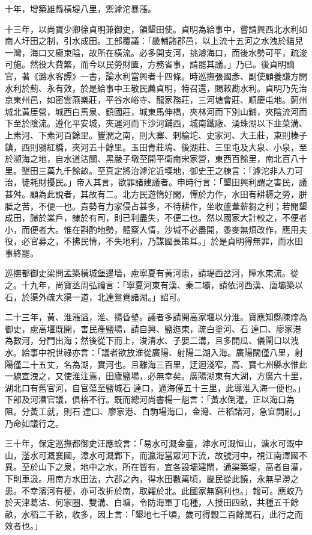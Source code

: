 十年，增築雄縣橫堤八里，禦滹沱暴漲。

十三年，以尚寶少卿徐貞明兼御史，領墾田使。貞明為給事中，嘗請興西北水利如南人圩田之制，引水成田。工部覆議：「畿輔諸郡邑，以上流十五河之水洩於貓兒一灣，海口又極束隘，故所在橫流。必多開支河，挑濬海口，而後水勢可平，疏浚可施。然役大費繁，而今以民勞財匱，方務省事，請罷其議。」乃已。後貞明謫官，著《潞水客譚》一書，論水利當興者十四條。時巡撫張國彥、副使顧養謙方開水利於薊、永有效，於是給事中王敬民薦貞明，特召還，賜敕勘水利。貞明乃先治京東州邑，如密雲燕樂莊，平谷水峪寺、龍家務莊，三河塘會莊、順慶屯地。薊州城北黃厓營，城西白馬泉、鎮國莊，城東馬伸橋，夾林河而下別山鋪，夾陰流河而下至於陰流。遵化平安城，夾運河而下沙河鋪西，城南鐵廠、湧珠湖以下韭菜溝、上素河、下素河百餘里。豐潤之南，則大寨、剌榆坨、史家河、大王莊，東則榛子鎮，西則鴉紅橋，夾河五十餘里。玉田青莊塢、後湖莊、三里屯及大泉、小泉，至於瀕海之地，自水道沽關、黑嚴子墩至開平衛南宋家營，東西百餘里，南北百八十里。墾田三萬九千餘畝。至真定將治滹沱近堧地，御史王之棟言：「滹沱非人力可治，徒耗財擾民。」帝入其言，欲罪諸建議者。申時行言：「墾田興利謂之害民，議甚舛。顧為此說者，其故有二。北方民遊惰好閑，憚於力作，水田有耕耨之勞，胼胝之苦，不便一也。貴勢有力家侵占甚多，不待耕作，坐收蘆葦薪芻之利；若開墾成田，歸於業戶，隸於有司，則已利盡失，不便二也。然以國家大計較之，不便者小，而便者大。惟在斟酌地勢，體察人情，沙堿不必盡開，黍麥無煩改作，應用夫役，必官募之，不拂民情，不失地利，乃謀國長策耳。」於是貞明得無罪，而水田事終罷。

巡撫都御史梁問孟築橫城堡邊墻，慮寧夏有黃河患，請堤西岔河，障水東流。從之。十九年，尚寶丞周弘禴言：「寧夏河東有漢、秦二壩，請依河西漢、唐壩築以石，於渠外疏大渠一道，北達鴛鴦諸湖。」詔可。

二十三年，黃、淮漲溢，淮、揚昏墊。議者多請開高家堰以分淮。寶應知縣陳煃為御史，慮高堰既開，害民產鹽場，請自興、鹽迤東，疏白塗河、石達口、廖家港為數河，分門出海；然後從下而上，浚清水、子嬰二溝，且多開瓜、儀閘口以洩水。給事中祝世祿亦言：「議者欲放淮從廣陽、射陽二湖入海。廣陽闊僅八里，射陽僅二十五丈，名為湖，實河也。且離海三百里，迂迴淺窄，高、寶七州縣水惟此一線宣洩之，又使淮注焉，田廬鹽場，必無幸矣。廣陽湖東有大湖，方廣六十里，湖北口有舊官河，自官蕩至鹽城石達口，通海僅五十三里，此導淮入海一便也。」下部及河漕官議，俱格不行。既而總河尚書楊一魁言：「黃水倒灌，正以海口為阻。分黃工就，則石達口、廖家港、白駒場海口，金灣、芒稻諸河，急宜開刷。」乃命如議行之。

三十年，保定巡撫都御史汪應蛟言：「易水可溉金臺，滹水可溉恒山，溏水可溉中山，滏水可溉襄國，漳水可溉鄴下，而瀛海當眾河下流，故號河中，視江南澤國不異。至於山下之泉，地中之水，所在皆有，宜各設壩建閘，通渠築堤，高者自灌，下則車汲。用南方水田法，六郡之內，得水田數萬頃，畿民從此饒，永無旱澇之患。不幸濱河有梗，亦可改折於南，取糴於北。此國家無窮利也。」報可。應蛟乃於天津葛沽、何家圈、雙溝、白塘，令防海軍丁屯種，人授田四畝，共種五千餘畝，水稻二千畝，收多，因上言：「墾地七千頃，歲可得穀二百餘萬石，此行之而效者也。」

